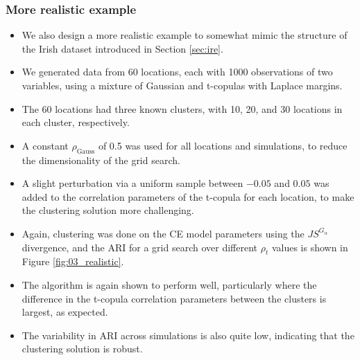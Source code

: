 \documentclass{article}
\numberwithin{equation}{section}
\begin{document}
\subsubsection{More realistic example} \label{subsubsec:sim_realistic}

\begin{itemize}
  \item We also design a more realistic example to somewhat mimic the structure of the Irish dataset introduced in Section \ref{sec:ire}.
  \item We generated data from 60 locations, each with 1000 observations of two variables, using a mixture of Gaussian and t-copulas with Laplace margins.
  \item The 60 locations had three known clusters, with 10, 20, and 30 locations in each cluster, respectively.
  \item A constant $\rho_{\text{Gauss}}$ of 0.5 was used for all locations and simulations, to reduce the dimensionality of the grid search.
  \item A slight perturbation via a uniform sample between $-0.05$ and $0.05$ was added to the correlation parameters of the t-copula for each location, to make the clustering solution more challenging.
  \item Again, clustering was done on the CE model parameters using the $JS^{G_{\alpha}}$ divergence, and the ARI for a grid search over different $\rho_t$ values is shown in Figure \ref{fig:03_realistic}.
  \item The algorithm is again shown to perform well, particularly where the difference in the t-copula correlation parameters between the clusters is largest, as expected.
  \item The variability in ARI across simulations is also quite low, indicating that the clustering solution is robust.
\end{itemize}
\end{document}
